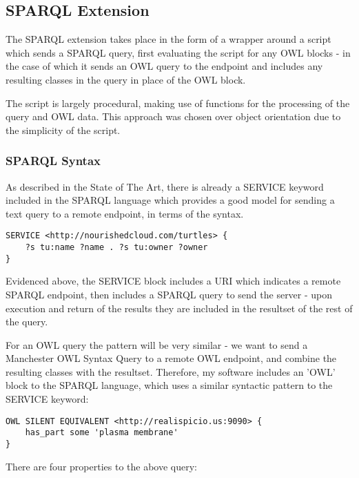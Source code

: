 \documentclass{article}
\begin{document}
\subsection{SPARQL Extension}

The SPARQL extension takes place in the form of a wrapper around a script which
sends a SPARQL query, first evaluating the script for any OWL blocks - in the
case of which it sends an OWL query to the endpoint and includes any resulting
classes in the query in place of the OWL block.

The script is largely procedural, making use of functions for the processing of
the query and OWL data. This approach was chosen over object orientation due to
the simplicity of the script.

\subsubsection{SPARQL Syntax}

As described in the State of The Art, there is already a SERVICE keyword
included in the SPARQL language which provides a good model for sending a text
query to a remote endpoint, in terms of the syntax. 

\begin{lstlisting}
SERVICE <http://nourishedcloud.com/turtles> { 
    ?s tu:name ?name . ?s tu:owner ?owner
}
\end{lstlisting}

Evidenced above, the SERVICE block includes a URI which indicates a remote
SPARQL endpoint, then includes a SPARQL query to send the server - upon
execution and return of the results they are included in the resultset of the
rest of the query.

For an OWL query the pattern will be very similar - we want to send a Manchester
OWL Syntax Query to a remote OWL endpoint, and combine the resulting classes
with the resultset. Therefore, my software includes an 'OWL' block to the SPARQL 
language, which uses a similar syntactic pattern to the SERVICE keyword:

\begin{lstlisting}
OWL SILENT EQUIVALENT <http://realispicio.us:9090> {
    has_part some 'plasma membrane'
}
\end{lstlisting}

There are four properties to the above query:
\end{document}
